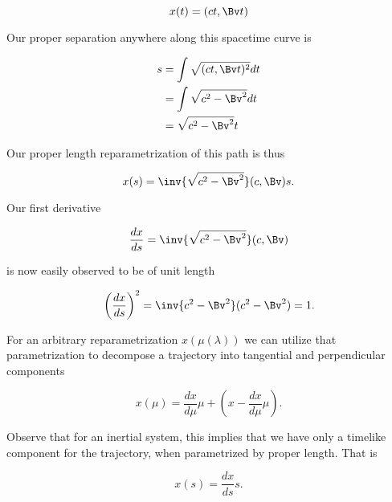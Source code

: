 \documentclass[iop,onecolumn]{emulateapj}
\begin{document}
\begin{equation}\label{eqn:grahamSchmidtLorentz:440}
x(t) = (c t, \Bv t)
\end{equation}

Our proper separation anywhere along this spacetime curve is

\begin{equation}\label{eqn:grahamSchmidtLorentz:460}
\begin{aligned}
s
&= \int \sqrt{(c t, \Bv t)^2} dt  \\
&= \int \sqrt{ c^2 - \Bv^2 } dt  \\
&= \sqrt{ c^2 - \Bv^2 } t
\end{aligned}
\end{equation}

Our proper length reparametrization of this path is thus

\begin{equation}\label{eqn:grahamSchmidtLorentz:480}
x(s) = \inv{\sqrt{c^2 - \Bv^2}} (c, \Bv) s.
\end{equation}

Our first derivative

\begin{equation}\label{eqn:grahamSchmidtLorentz:500}
\frac{dx}{ds} = \inv{\sqrt{c^2 - \Bv^2}} (c, \Bv)
\end{equation}

is now easily observed to be of unit length

\begin{equation}\label{eqn:grahamSchmidtLorentz:520}
\left( \frac{dx}{ds} \right)^2 = \inv{c^2 - \Bv^2} (c^2 - \Bv^2) = 1.
\end{equation}

For an arbitrary reparametrization $x(\mu(\lambda))$ we can utilize that parametrization to decompose a trajectory into tangential and perpendicular components

\begin{equation}\label{eqn:grahamSchmidtLorentz:540}
x(\mu) = \frac{dx}{d\mu} \mu + \left( x - \frac{dx}{d\mu} \mu \right).
\end{equation}

Observe that for an inertial system, this implies that we have only a timelike component for the trajectory, when parametrized by proper length.  That is

\begin{equation}\label{eqn:grahamSchmidtLorentz:580}
x(s) = \frac{dx}{ds} s.
\end{equation}
\end{document}
